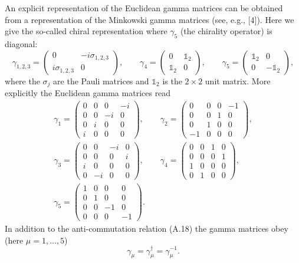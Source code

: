 An explicit representation of the Euclidean gamma matrices can be obtained from
a representation of the Minkowski gamma matrices (see, e.g., [4]). Here we give
the so-called chiral representation where $\gamma_5$ (the chirality operator)
is diagonal:
\begin{equation}
  \gamma_{1,2,3} = \begin{pmatrix} 0 & -i\sigma_{1,2,3} \\ i\sigma_{1,2,3} & 0 \end{pmatrix},\qquad
  \gamma_4 = \begin{pmatrix} 0 & \mathbb{1}_2 \\ \mathbb{1}_2 & 0 \end{pmatrix},\qquad
  \gamma_5 = \begin{pmatrix} \mathbb{1}_2 & 0 \\ 0 & -\mathbb{1}_2 \end{pmatrix},
\end{equation}
where the $\sigma_j$ are the Pauli matrices and $\mathbb{1}_2$ is the
$2\times 2$ unit matrix. More explicitly the Euclidean gamma matrices read
\begin{equation}
  \begin{gathered}
    \gamma_1 = \begin{pmatrix} 0 & 0 & 0 & -i \\ 0 & 0 & -i & 0 \\ 0 & i & 0 & 0 \\ i & 0 & 0 & 0 \end{pmatrix},\qquad
    \gamma_2 = \begin{pmatrix} 0 & 0 & 0 & -1 \\ 0 & 0 & 1 & 0 \\ 0 & 1 & 0 & 0 \\ -1 & 0 & 0 & 0 \end{pmatrix},\\[4pt]
    \gamma_3 = \begin{pmatrix} 0 & 0 & -i & 0 \\ 0 & 0 & 0 & i \\ i & 0 & 0 & 0 \\ 0 & -i & 0 & 0 \end{pmatrix},\qquad
    \gamma_4 = \begin{pmatrix} 0 & 0 & 1 & 0 \\ 0 & 0 & 0 & 1 \\ 1 & 0 & 0 & 0 \\ 0 & 1 & 0 & 0 \end{pmatrix},\\[4pt]
    \gamma_5 = \begin{pmatrix} 1 & 0 & 0 & 0 \\ 0 & 1 & 0 & 0 \\ 0 & 0 & -1 & 0 \\ 0 & 0 & 0 & -1 \end{pmatrix}.
  \end{gathered}
\end{equation}
In addition to the anti-commutation relation (A.18) the gamma matrices obey
(here $\mu = 1, \ldots, 5$)
\begin{equation}
  \gamma_\mu = \gamma_\mu^\dagger = \gamma_\mu^{-1}.
\end{equation}

